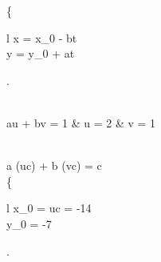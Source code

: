 \documentclass[12pt]{article}
\begin{document}
{		\left \{
			\begin{array}{l}
			x = x_{0} - bt \\
			y = y_{0} + at
			\end{array}
		\right .
		 \\
		\\
		\begin{matrix}au + bv = 1 & u = 2 & v = 1\end{matrix} \\
		a (uc) + b (vc) = c \\
		\left \{
			\begin{array}{l}
				x_{0} = uc = -14 \\
				y_{0} = -7
			\end{array}
		\right .
	}
	\clearpage
\end{document}
